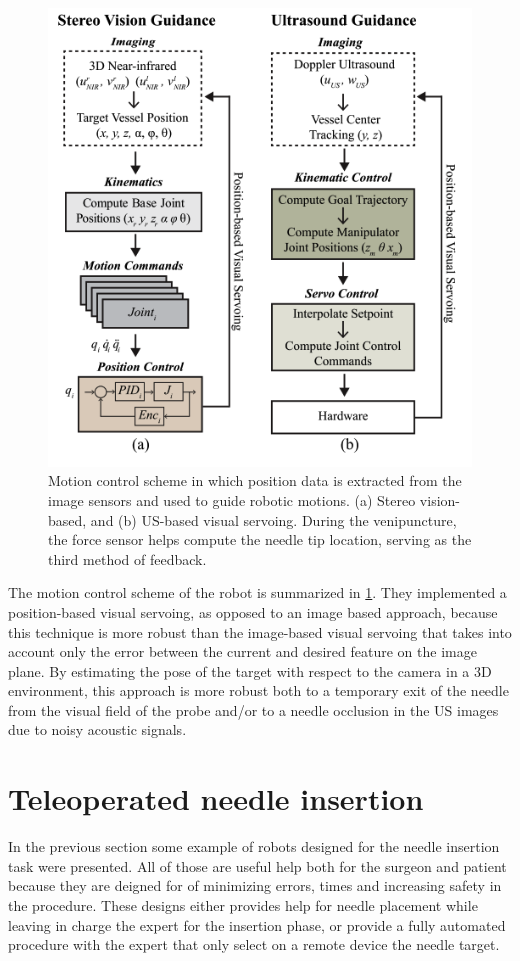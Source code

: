 \begin{figure}
	\includegraphics[width=\textwidth]{images/control_scheme_vessel.png}
	\caption[Venipuncture device control schema]{Motion control scheme in which position data is extracted from the image sensors and used to guide robotic motions. (a) Stereo vision- based, and (b) US-based visual servoing. During the venipuncture, the force sensor helps compute the needle tip location, serving as the third method of feedback. \cite{Balter2017}}
	\label{fig:control_scheme_vessel}
\end{figure}
The motion control scheme of the robot is summarized in \figurename{ \ref{fig:control_scheme_vessel}}.
They implemented a position-based visual servoing, as opposed to an image based approach, because this technique is more robust than the image-based visual servoing that takes into account only the error between the current and desired feature on the image plane. By estimating the pose of the target with respect to the camera in a 3D environment, this approach is more robust both to a temporary exit of the needle from the visual field of the probe  and/or to a needle occlusion  in the US images due to noisy acoustic signals.

\section{Teleoperated needle insertion }
In the previous section some example of robots designed for the needle insertion task were presented. All of those are useful help both for the surgeon and patient because  they are deigned for of minimizing errors, times and increasing safety in the procedure. These designs either provides help for needle placement while leaving in charge the expert for the insertion phase, or provide a fully automated procedure with the expert that only select on a remote device the needle target.

